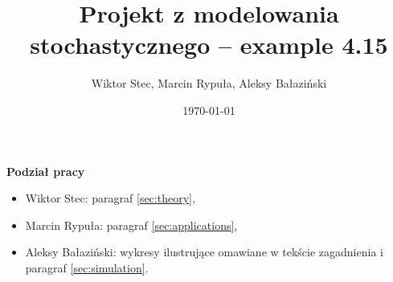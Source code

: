 \documentclass{article}
\title{Projekt z modelowania stochastycznego -- example 4.15}
\author{Wiktor Stec, Marcin Rypuła, Aleksy Bałaziński}
\date{\today}
\begin{document}
\maketitle
\tableofcontents

\vspace{1.5cm}
{\large\textbf{Podział pracy}}
\begin{itemize}
    \item Wiktor Stec: paragraf \ref{sec:theory},
    \item Marcin Rypuła: paragraf \ref{sec:applications},
    \item Aleksy Bałaziński: wykresy ilustrujące omawiane w tekście zagadnienia i paragraf \ref{sec:simulation}.
\end{itemize}
\newpage









\end{document}
